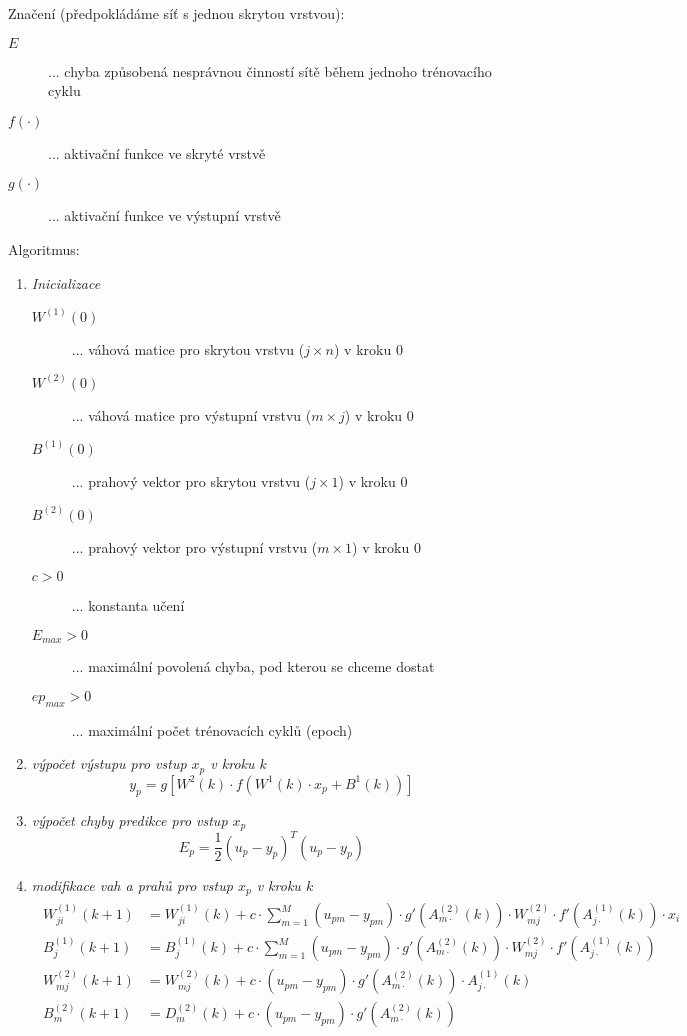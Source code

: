 Značení (předpokládáme síť s jednou skrytou vrstvou):
\begin{description}
\item[$ E $] ... chyba způsobená nesprávnou činností sítě během jednoho trénovacího cyklu
\item[$ f(\cdot) $] ... aktivační funkce ve skryté vrstvě
\item[$ g(\cdot) $] ... aktivační funkce ve výstupní vrstvě
\end{description}

Algoritmus:
\begin{enumerate}[label=(\roman*)]
\item \textit{Inicializace}
\begin{description}
\item[$ W^{(1)}(0) $] ... váhová matice pro skrytou vrstvu ($ j \times n $) v kroku 0
\item[$ W^{(2)}(0) $] ... váhová matice pro výstupní vrstvu ($ m \times j $) v kroku 0
\item[$ B^{(1)}(0) $] ... prahový vektor pro skrytou vrstvu ($ j \times 1 $) v kroku 0
\item[$ B^{(2)}(0) $] ... prahový vektor pro výstupní vrstvu ($ m \times 1 $) v kroku 0
\item[$ c > 0 $] ... konstanta učení
\item[$ E_{max} > 0 $] ... maximální povolená chyba, pod kterou se chceme dostat
\item[$ ep_{max} > 0 $] ... maximální počet trénovacích cyklů (epoch)
\end{description}

\item \textit{výpočet výstupu pro vstup $ x_p $ v kroku $ k $}
\begin{equation}
y_p = g\left[ W^{2}(k) \cdot f(W^{1}(k) \cdot x_p + B^{1}(k)) \right]
\end{equation}

\item \textit{výpočet chyby predikce pro vstup $ x_p $}
\begin{equation}
E_p = \frac{1}{2} (u_p - y_p)^T (u_p - y_p)
\end{equation}

\item \textit{modifikace vah a prahů pro vstup $ x_p $ v kroku $ k $}
\begin{align}
\begin{split}
W_{ji}^{(1)}(k+1) &= W_{ji}^{(1)}(k) + c \cdot \displaystyle{\sum_{m=1}^M} (u_{pm} - y_{pm}) \cdot g'(A_{m\cdot}^{(2)}(k)) \cdot W_{mj}^{(2)} \cdot f'(A_{j\cdot}^{(1)}(k)) \cdot x_i \\
B_{j}^{(1)}(k+1) &= B_{j}^{(1)}(k) + c \cdot \displaystyle{\sum_{m=1}^M} (u_{pm} - y_{pm}) \cdot g'(A_{m\cdot}^{(2)}(k)) \cdot W_{mj}^{(2)} \cdot f'(A_{j\cdot}^{(1)}(k)) \\
W_{mj}^{(2)}(k+1) &= W_{mj}^{(2)}(k) + c \cdot (u_{pm} - y_{pm}) \cdot g'(A_{m\cdot}^{(2)}(k)) \cdot A_{j\cdot}^{(1)}(k) \\
B_{m}^{(2)}(k+1) &= D_{m}^{(2)}(k) + c \cdot (u_{pm} - y_{pm}) \cdot g'(A_{m\cdot}^{(2)}(k))
\end{split}
\end{align}


\end{enumerate}
